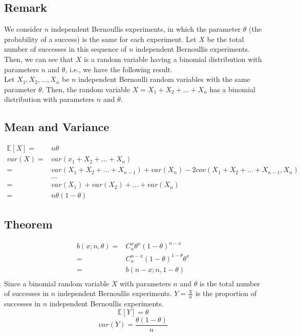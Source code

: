 \documentclass[titlepage]{article}
\begin{document}
        \subsection*{Remark}
        We consider $n$ independent Bernoullis experiments, in
        which the parameter $\theta$ (the probability of a success) is the same
        for each experiment. Let $X$ be the total number of successes in
        this sequence of $n$ independent Bernoullis experiments. Then, we
        can see that $X$ is a random variable having a binomial distribution
        with parameters $n$ and $\theta$, i.e., we have the following result.
        \\
        Let $X_1,X_2,...,X_n$ be $n$ independent Bernoulli random variables with the same parameter $\theta$. Then, the random variable $X=X_1+X_2+...+X_n$ has a binomial distribution with parameters $n$ and $\theta$.
        \subsection*{Mean and Variance}
                \begin{equation*}
                    \begin{split}
                        \mathbb{E}[X]=&n\theta\\
                        var(X)=&var(x_1+X_2+...+X_n)\\
                            =&var(X_1+X_2+...+X_{n-1})+var(X_n)-2cov(X_1+X_2+...+X_{n-1},X_n)\\
                            &...\\
                            =&var(X_1)+var(X_2)+...+var(X_n)\\
                            =&n\theta(1-\theta)
                    \end{split}
                \end{equation*}
            
        \subsection*{Theorem}
                    \begin{equation*}
                        \begin{split}
                            b(x;n,\theta)=&C_n^x\theta^x(1-\theta)^{n-x}\\
                                =&C_n^{n-x}(1-\theta)^{1-\theta}\theta^x\\
                                =&b(n-x;n,1-\theta)\\
                        \end{split}
                    \end{equation*}
                    Since a binomial random variable $X$ with parameters $n$ and $\theta$ is the total number of successes in $n$ independent Bernoullis experiments. $Y=\frac{X}{n}$ is the proportion of successes in $n$ independent Bernoullis experiments.
                    $$\mathbb{E}[Y]=\theta$$
                    $$var(Y)=\frac{\theta(1-\theta)}{n}$$
                
\end{document}
